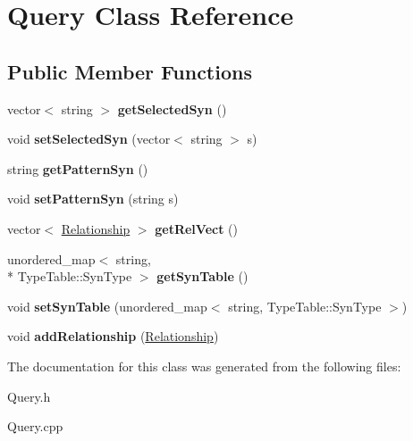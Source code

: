 \hypertarget{class_query}{\section{Query Class Reference}
\label{class_query}
}
\subsection*{Public Member Functions}
\begin{DoxyCompactItemize}
\item 
\hypertarget{class_query_af7561b6348c8cab7bd92764442aadee2}{vector$<$ string $>$ {\bfseries get\+Selected\+Syn} ()}\label{class_query_af7561b6348c8cab7bd92764442aadee2}

\item 
\hypertarget{class_query_a588c9b6dc7cdf70783d05f8124faea00}{void {\bfseries set\+Selected\+Syn} (vector$<$ string $>$ s)}\label{class_query_a588c9b6dc7cdf70783d05f8124faea00}

\item 
\hypertarget{class_query_a9216de3d5cf3b6d390557d29430ac826}{string {\bfseries get\+Pattern\+Syn} ()}\label{class_query_a9216de3d5cf3b6d390557d29430ac826}

\item 
\hypertarget{class_query_aa79f178636f6af0f8f8084f6df6b67cb}{void {\bfseries set\+Pattern\+Syn} (string s)}\label{class_query_aa79f178636f6af0f8f8084f6df6b67cb}

\item 
\hypertarget{class_query_ab5f94d06f2f7172ca732cfba97ed91e7}{vector$<$ \hyperlink{class_relationship}{Relationship} $>$ {\bfseries get\+Rel\+Vect} ()}\label{class_query_ab5f94d06f2f7172ca732cfba97ed91e7}

\item 
\hypertarget{class_query_a0dff0a3c7113088e0ca46f32cc296f49}{unordered\+\_\+map$<$ string, \\*
Type\+Table\+::\+Syn\+Type $>$ {\bfseries get\+Syn\+Table} ()}\label{class_query_a0dff0a3c7113088e0ca46f32cc296f49}

\item 
\hypertarget{class_query_a7a5a2bab9284b5c9b71f0622cdb155f3}{void {\bfseries set\+Syn\+Table} (unordered\+\_\+map$<$ string, Type\+Table\+::\+Syn\+Type $>$)}\label{class_query_a7a5a2bab9284b5c9b71f0622cdb155f3}

\item 
\hypertarget{class_query_a70b2b1d08bfee10a9a782c5f7c59fc9b}{void {\bfseries add\+Relationship} (\hyperlink{class_relationship}{Relationship})}\label{class_query_a70b2b1d08bfee10a9a782c5f7c59fc9b}

\end{DoxyCompactItemize}


The documentation for this class was generated from the following files\+:\begin{DoxyCompactItemize}
\item 
Query.\+h\item 
Query.\+cpp\end{DoxyCompactItemize}
